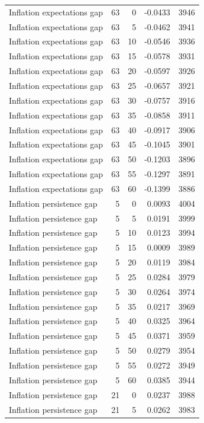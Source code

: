 \begin{tabular}{lrrrr}
Inflation expectations gap & 63 & 0 & -0.0433 & 3946 \\
Inflation expectations gap & 63 & 5 & -0.0462 & 3941 \\
Inflation expectations gap & 63 & 10 & -0.0546 & 3936 \\
Inflation expectations gap & 63 & 15 & -0.0578 & 3931 \\
Inflation expectations gap & 63 & 20 & -0.0597 & 3926 \\
Inflation expectations gap & 63 & 25 & -0.0657 & 3921 \\
Inflation expectations gap & 63 & 30 & -0.0757 & 3916 \\
Inflation expectations gap & 63 & 35 & -0.0858 & 3911 \\
Inflation expectations gap & 63 & 40 & -0.0917 & 3906 \\
Inflation expectations gap & 63 & 45 & -0.1045 & 3901 \\
Inflation expectations gap & 63 & 50 & -0.1203 & 3896 \\
Inflation expectations gap & 63 & 55 & -0.1297 & 3891 \\
Inflation expectations gap & 63 & 60 & -0.1399 & 3886 \\
Inflation persistence gap & 5 & 0 & 0.0093 & 4004 \\
Inflation persistence gap & 5 & 5 & 0.0191 & 3999 \\
Inflation persistence gap & 5 & 10 & 0.0123 & 3994 \\
Inflation persistence gap & 5 & 15 & 0.0009 & 3989 \\
Inflation persistence gap & 5 & 20 & 0.0119 & 3984 \\
Inflation persistence gap & 5 & 25 & 0.0284 & 3979 \\
Inflation persistence gap & 5 & 30 & 0.0264 & 3974 \\
Inflation persistence gap & 5 & 35 & 0.0217 & 3969 \\
Inflation persistence gap & 5 & 40 & 0.0325 & 3964 \\
Inflation persistence gap & 5 & 45 & 0.0371 & 3959 \\
Inflation persistence gap & 5 & 50 & 0.0279 & 3954 \\
Inflation persistence gap & 5 & 55 & 0.0272 & 3949 \\
Inflation persistence gap & 5 & 60 & 0.0385 & 3944 \\
Inflation persistence gap & 21 & 0 & 0.0237 & 3988 \\
Inflation persistence gap & 21 & 5 & 0.0262 & 3983 \\

\end{tabular}
